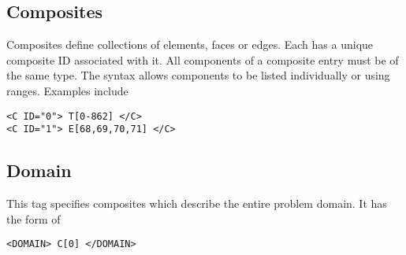 \subsection{Composites}

Composites define collections of elements, faces or edges. Each has a unique composite ID associated with it. All components of a composite entry must be of the same type. The syntax allows components to be listed individually or using ranges. Examples include
\begin{lstlisting}[style=XMLStyle]
<C ID="0"> T[0-862] </C>
<C ID="1"> E[68,69,70,71] </C>
\end{lstlisting}

\subsection{Domain}

This tag specifies composites which describe the entire problem domain. It has the form of
\begin{lstlisting}[style=XMLStyle]
<DOMAIN> C[0] </DOMAIN>
\end{lstlisting}
